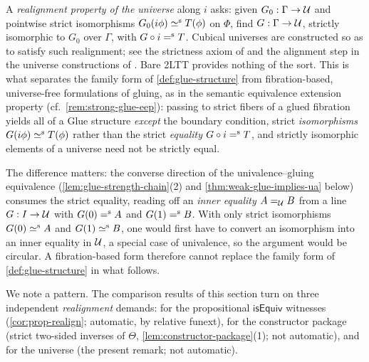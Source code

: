 \begin{longversion}
\begin{remark}\label{rem:universe-realignment}
	A \emph{realignment property of the universe} along $i$ asks: given
	$G_0:\Gamma\to\mathcal{U}$ and pointwise strict isomorphisms
	$G_0(i\phi)\mathrel{\simeq^\textup{s}} T(\phi)$ on $\Phi$, find $G:\Gamma\to\mathcal{U}$, strictly
	isomorphic to $G_0$ over $\Gamma$, with $G\circ i\mathrel{=^\textup{s}} T$.
	Cubical universes are constructed so as to satisfy such realignment;
	see the strictness axiom of \citet[Sec.~6]{OrtonPitts2018} and the
	alignment step in the universe constructions of \citet{ABCFHL2021}.
	Bare 2LTT provides nothing of the sort. This is what separates the
	family form of \cref{def:glue-structure} from fibration-based,
	universe-free formulations of gluing, as in the semantic equivalence
	extension property (cf.\ \cref{rem:strong-glue-eep}): passing to strict
	fibers of a glued fibration yields all of a Glue structure \emph{except}
	the boundary condition, strict \emph{isomorphisms}
	$G(i\phi)\mathrel{\simeq^\textup{s}} T(\phi)$ rather than the strict \emph{equality}
	$G\circ i\mathrel{=^\textup{s}} T$, and strictly isomorphic elements of a universe need
	not be strictly equal.

	The difference matters: the converse direction of the
	univalence--gluing equivalence (\cref{lem:glue-strength-chain}(2) and
	\cref{thm:weak-glue-implies-ua} below) consumes the strict equality,
	reading off an \emph{inner equality}
	$A=_{\mathcal{U}} B$ from a line $G:I\to\mathcal{U}$ with $G(0)\mathrel{=^\textup{s}} A$ and $G(1)\mathrel{=^\textup{s}} B$.
	With only strict isomorphisms $G(0)\mathrel{\simeq^\textup{s}} A$ and
	$G(1)\mathrel{\simeq^\textup{s}} B$, one would first have to convert an
	isomorphism into an inner equality in $\mathcal{U}$, a special case of univalence, so
	the argument would be circular. A fibration-based form therefore cannot
	replace the family form of \cref{def:glue-structure} in what follows.

	We note a pattern. The comparison results of this section turn on
	three independent \emph{realignment} demands: for the propositional
	$\mathsf{isEquiv}$ witnesses (\cref{cor:prop-realign}; automatic, by
	relative funext), for the constructor package (strict two-sided
	inverses of $\Theta$, \cref{lem:constructor-package}(1); not automatic),
	and for the universe (the present remark; not automatic).
\end{remark}
\end{longversion}


